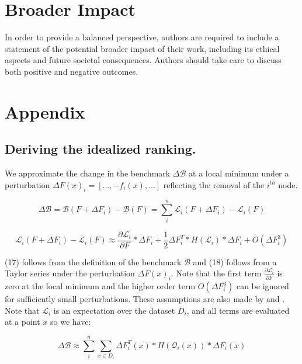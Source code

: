 \documentclass{article}
\begin{document}
\section{Broader Impact}
In order to provide a balanced perspective, authors are required to include a statement of the potential broader impact of their work, including its ethical aspects and future societal consequences. Authors should take care to discuss both positive and negative outcomes.

\small


\section{Appendix}

\subsection{Deriving the idealized ranking.}

We approximate the change in the benchmark $\Delta \mathcal{B}$ at a local minimum under a perturbation $\Delta F (x)_i = [ ..., -f_i(x) , ...]$ reflecting the removal of the $i^{th}$ node.
\smallskip

\begin{equation}
\Delta \mathcal{B} = \mathcal{B}(F + \Delta F_i) - \mathcal{B}(F) = \sum_{i}^{n} \mathcal{L}_i(F + \Delta F_i) - \mathcal{L}_i(F)
\end{equation}

\begin{equation}
\mathcal{L}_i(F + \Delta F_i) - \mathcal{L}_i(F) \approx \frac{\partial \mathcal{L}_i}{\partial F} * \Delta F_i + \frac{1}{2} \Delta F_i^T * H(\mathcal{L}_i) * \Delta F_i + O(\Delta F_i^3)
\end{equation}

(17) follows from the definition of the benchmark $\mathcal{B}$ and (18) follows from a Taylor series under the perturbation $\Delta F (x)_i$. Note that the first term $\frac{\partial \mathcal{L}_i}{\partial F}$ is zero at the local minimum and the higher order term $O(\Delta F_i^3)$ can be ignored for sufficiently small perturbations. These assumptions are also made by \cite{lecun1989optimalbraindamage} and \cite{yu2017nisp}. Note that $\mathcal{L}_i$ is an expectation over the dataset $D_i$, and all terms are evaluated at a point $x$ so we have:
\smallskip

\begin{equation}
\Delta \mathcal{B} \approx \sum_{i}^{n} \sum_{x \in D_i}  \Delta F_i^T(x) * H(\mathcal{Q}_i(x)) * \Delta F_i(x) 
\end{equation}
\end{document}
